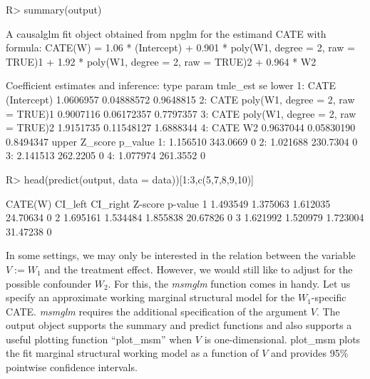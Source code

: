 \documentclass[
]{jss}
\begin{document}
\begin{CodeChunk}
\begin{CodeInput}
R> summary(output)
\end{CodeInput}
\begin{CodeOutput}
A causalglm fit object obtained from npglm for the estimand CATE with formula: 
CATE(W) = 1.06 * (Intercept) + 0.901 * poly(W1, degree = 2, raw = TRUE)1 + 1.92 * poly(W1, degree = 2, raw = TRUE)2 + 0.964 * W2

Coefficient estimates and inference:
   type                             param  tmle_est         se     lower
1: CATE                       (Intercept) 1.0606957 0.04888572 0.9648815
2: CATE poly(W1, degree = 2, raw = TRUE)1 0.9007116 0.06172357 0.7797357
3: CATE poly(W1, degree = 2, raw = TRUE)2 1.9151735 0.11548127 1.6888344
4: CATE                                W2 0.9637044 0.05830190 0.8494347
      upper  Z_score p_value
1: 1.156510 343.0669       0
2: 1.021688 230.7304       0
3: 2.141513 262.2205       0
4: 1.077974 261.3552       0
\end{CodeOutput}
\begin{CodeInput}
R> head(predict(output, data = data))[1:3,c(5,7,8,9,10)]
\end{CodeInput}
\begin{CodeOutput}
   CATE(W)  CI_left CI_right  Z-score p-value
1 1.493549 1.375063 1.612035 24.70634       0
2 1.695161 1.534484 1.855838 20.67826       0
3 1.621992 1.520979 1.723004 31.47238       0
\end{CodeOutput}
\end{CodeChunk}

In some settings, we may only be interested in the relation between the
variable \(V := W_1\) and the treatment effect. However, we would still
like to adjust for the possible confounder \(W_2\). For this, the
\textit{msmglm} function comes in handy. Let us specify an approximate
working marginal structural model for the \(W_1\)-specific CATE.
\textit{msmglm} requires the additional specification of the argument
\(V\). The output object supports the summary and predict functions and
also supports a useful plotting function ``plot\_msm'' when \(V\) is
one-dimensional. plot\_msm plots the fit marginal structural working
model as a function of \(V\) and provides 95\% pointwise confidence
intervals.
\end{document}

